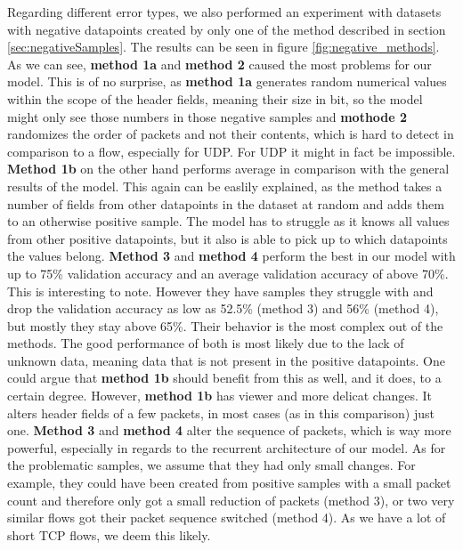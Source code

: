 \documentclass[
	ngerman,
	ruledheaders=section,%
	class=report,%
	thesis={type=bachelor},%
	accentcolor=9c,%
	custommargins=true,%
	marginpar=false,%
	parskip=half-,%
	fontsize=11pt,%
]{tudapub}
\begin{document}
Regarding different error types, we also performed an experiment with datasets with negative datapoints created by only one of the method described in section \ref{sec:negativeSamples}.
The results can be seen in figure \ref{fig:negative_methods}.
As we can see, \textbf{method 1a} and \textbf{method 2} caused the most problems for our model.
This is of no surprise, as \textbf{method 1a} generates random numerical values within the scope of the header fields, meaning their size in bit, so the model might only see those numbers in those negative samples and \textbf{mothode 2} randomizes the order of packets and not their contents, which is hard to detect in comparison to a flow, especially for UDP.
For UDP it might in fact be impossible.
\textbf{Method 1b} on the other hand performs average in comparison with the general results of the model.
This again can be easlily explained, as the method takes a number of fields from other datapoints in the dataset at random and adds them to an otherwise positive sample.
The model has to struggle as it knows all values from other positive datapoints, but it also is able to pick up to which datapoints the values belong.
\textbf{Method 3} and \textbf{method 4} perform the best in our model with up to 75\% validation accuracy and an average validation accuracy of above 70\%.
This is interesting to note.
However they have samples they struggle with and drop the validation accuracy as low as 52.5\% (method 3) and 56\% (method 4), but mostly they stay above 65\%.
Their behavior is the most complex out of the methods.
The good performance of both is most likely due to the lack of unknown data, meaning data that is not present in the positive datapoints.
One could argue that \textbf{method 1b} should benefit from this as well, and it does, to a certain degree.
However, \textbf{method 1b} has viewer and more delicat changes. It alters header fields of a few packets, in most cases (as in this comparison) just one.
\textbf{Method 3} and \textbf{method 4} alter the sequence of packets, which is way more powerful, especially in regards to the recurrent architecture of our model.
As for the problematic samples, we assume that they had only small changes.
For example, they could have been created from positive samples with a small packet count and therefore only got a small reduction of packets (method 3), or two very similar flows got their packet sequence switched (method 4).
As we have a lot of short TCP flows, we deem this likely.
\end{document}
